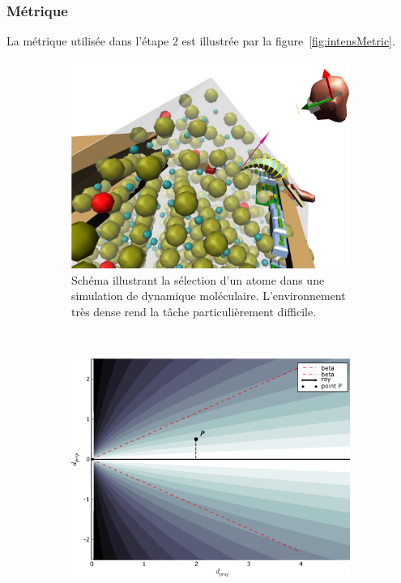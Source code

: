 	\subsubsection{Métrique}
	La métrique utilisée dans l'étape 2 est illustrée par la figure~\ref{fig:intensMetric}.
	
	\begin{figure}[!htb]
		\begin{subfigure}[t]{0.49\textwidth}
			\centering
			\includegraphics[width=\textwidth]{figures/ch2/intensMD}
			\caption{Schéma illustrant la sélection d'un atome dans une simulation de dynamique moléculaire. L'environnement très dense rend la tâche particulièrement difficile.}
			\label{fig:intensMD}
		\end{subfigure}
		~
		\begin{subfigure}[t]{0.49\textwidth}
			\centering
			\includegraphics[width=\textwidth]{figures/ch2/intensMetric}

\end{subfigure}
\end{figure}

